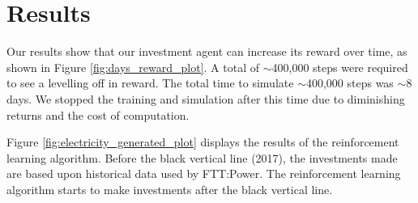 \documentclass{article}
\begin{document}



%



\section{Results}
\label{sec:results}


%

Our results show that our investment agent can increase its reward over time, as shown in Figure \ref{fig:days_reward_plot}. A total of ${\sim}$400,000 steps were required to see a levelling off in reward. The total time to simulate ${\sim}$400,000 steps was ${\sim}$8 days. We stopped the training and simulation after this time due to diminishing returns and the cost of computation.

Figure \ref{fig:electricity_generated_plot} displays the results of the reinforcement learning algorithm. Before the black vertical line (2017), the investments made are based upon historical data used by FTT:Power. The reinforcement learning algorithm starts to make investments after the black vertical line. 
\end{document}
